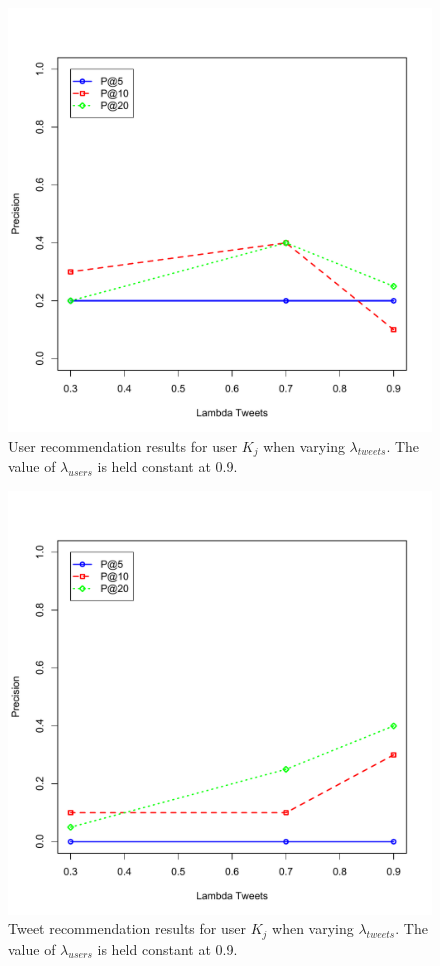 \begin{figure}
  \centering
  \includegraphics[scale=0.75]{Kj_Varying_LambdaTweets_UserResults}
  \caption[User recommendation results for user $K_{j}$ when varying $\lambda_{tweets}$]{User recommendation results for user $K_{j}$ when varying $\lambda_{tweets}$. The value of $\lambda_{users}$ is held constant at 0.9.}
  \label{fig:KjUsersForVaryingLambdaTweets}
\end{figure}
\begin{figure}
  \centering
  \includegraphics[scale=0.75]{Kj_Varying_LambdaTweets_TweetResults}
  \caption[Tweet recommendation results for user $K_{j}$ when varying $\lambda_{tweets}$]{Tweet recommendation results for user $K_{j}$ when varying $\lambda_{tweets}$. The value of $\lambda_{users}$ is held constant at 0.9.}
  \label{fig:KjTweetsForVaryingLambdaTweets}
\end{figure}


